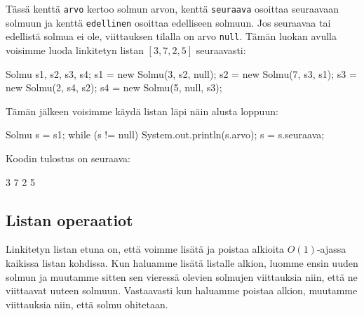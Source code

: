 Tässä kenttä \texttt{arvo} kertoo solmun arvon,
kenttä \texttt{seuraava} osoittaa seuraavaan solmuun
ja kenttä \texttt{edellinen} osoittaa edelliseen solmuun.
Jos seuraavaa tai edellistä solmua ei ole,
viittauksen tilalla on arvo \texttt{null}.
Tämän luokan avulla voisimme luoda linkitetyn listan $[3,7,2,5]$
seuraavasti:

\begin{code}
Solmu s1, s2, s3, s4;
s1 = new Solmu(3, s2, null);
s2 = new Solmu(7, s3, s1);
s3 = new Solmu(2, s4, s2);
s4 = new Solmu(5, null, s3);
\end{code}

Tämän jälkeen voisimme käydä listan läpi näin alusta loppuun:

\begin{code}
Solmu s = s1;
while (s != null) {
    System.out.println(s.arvo);
    s = s.seuraava;
}
\end{code}

Koodin tulostus on seuraava:

\begin{code}
3
7
2
5
\end{code}

\subsection{Listan operaatiot}

Linkitetyn listan etuna on,
että voimme lisätä ja poistaa
alkioita $O(1)$-ajassa kaikissa listan kohdissa.
Kun haluamme lisätä listalle alkion,
luomme ensin uuden solmun ja muutamme sitten
sen vieressä olevien solmujen viittauksia niin,
että ne viittaavat uuteen solmuun.
Vastaavasti kun haluamme poistaa alkion,
muutamme viittauksia niin, että solmu ohitetaan.

